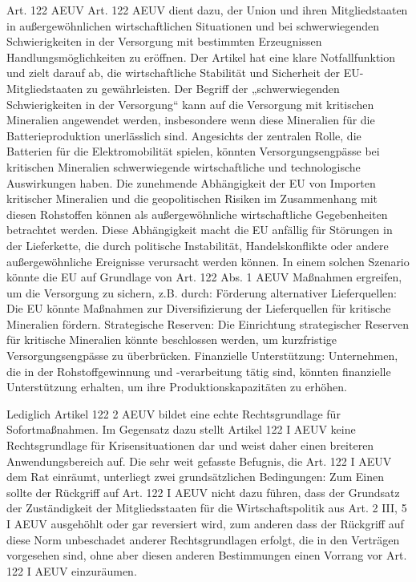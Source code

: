 \documentclass[12pt,a4paper,oneside]{book} %
\begin{document}
	
	
	Art. 122 AEUV
	Art. 122 AEUV dient dazu, der Union und ihren Mitgliedstaaten in außergewöhnlichen wirtschaftlichen Situationen und bei schwerwiegenden Schwierigkeiten in der Versorgung mit bestimmten Erzeugnissen Handlungsmöglichkeiten zu eröffnen. Der Artikel hat eine klare Notfallfunktion und zielt darauf ab, die wirtschaftliche Stabilität und Sicherheit der EU-Mitgliedstaaten zu gewährleisten. Der Begriff der „schwerwiegenden Schwierigkeiten in der Versorgung“ kann auf die Versorgung mit kritischen Mineralien angewendet werden, insbesondere wenn diese Mineralien für die Batterieproduktion unerlässlich sind. Angesichts der zentralen Rolle, die Batterien für die Elektromobilität spielen, könnten Versorgungsengpässe bei kritischen Mineralien schwerwiegende wirtschaftliche und technologische Auswirkungen haben. Die zunehmende Abhängigkeit der EU von Importen kritischer Mineralien und die geopolitischen Risiken im Zusammenhang mit diesen Rohstoffen können als außergewöhnliche wirtschaftliche Gegebenheiten betrachtet werden. Diese Abhängigkeit macht die EU anfällig für Störungen in der Lieferkette, die durch politische Instabilität, Handelskonflikte oder andere außergewöhnliche Ereignisse verursacht werden können.  In einem solchen Szenario könnte die EU auf Grundlage von Art. 122 Abs. 1 AEUV Maßnahmen ergreifen, um die Versorgung zu sichern, z.B. durch: Förderung alternativer Lieferquellen: Die EU könnte Maßnahmen zur Diversifizierung der Lieferquellen für kritische Mineralien fördern.
	Strategische Reserven: Die Einrichtung strategischer Reserven für kritische Mineralien könnte beschlossen werden, um kurzfristige Versorgungsengpässe zu überbrücken. Finanzielle Unterstützung: Unternehmen, die in der Rohstoffgewinnung und -verarbeitung tätig sind, könnten finanzielle Unterstützung erhalten, um ihre Produktionskapazitäten zu erhöhen.
	
	Lediglich Artikel 122 2 AEUV bildet eine echte Rechtsgrundlage für Sofortmaßnahmen. Im Gegensatz dazu stellt Artikel 122 I AEUV keine Rechtsgrundlage für Krisensituationen dar und weist daher einen breiteren Anwendungsbereich auf. Die sehr weit gefasste Befugnis, die Art. 122 I AEUV dem Rat einräumt, unterliegt zwei grundsätzlichen Bedingungen: Zum Einen sollte der Rückgriff auf Art. 122 I AEUV nicht dazu führen, dass der Grundsatz der Zuständigkeit der Mitgliedsstaaten für die Wirtschaftspolitik aus Art. 2 III, 5 I AEUV ausgehöhlt oder gar reversiert wird, zum anderen dass der Rückgriff auf diese Norm unbeschadet anderer Rechtsgrundlagen erfolgt, die in den Verträgen vorgesehen sind, ohne aber diesen anderen Bestimmungen einen Vorrang vor Art. 122 I AEUV einzuräumen.\autocite{chamon_anwendung_2023}
	
\end{document}
